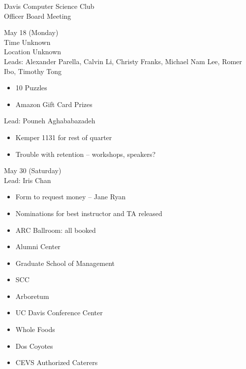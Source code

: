 \documentclass{article}
\begin{document}
\begin{Minutes}{Davis Computer Science Club\\Officer Board Meeting}

May 18 (Monday)\\
Time Unknown\\
Location Unknown\\
Leads: Alexander Parella, Calvin Li, Christy Franks, Michael Nam Lee, Romer Ibo, Timothy Tong\\

\begin{itemize}
	\item 10 Puzzles
	\item Amazon Gift Card Prizes
\end{itemize}


Lead: Pouneh Aghababazadeh

\begin{itemize}
	\item Kemper 1131 for rest of quarter
	\item Trouble with retention -- workshops, speakers?
\end{itemize}


May 30 (Saturday)\\
Lead: Iris Chan\\

\begin{itemize}
	\item Form to request money -- Jane Ryan
\item Nominations for best instructor and TA released
\end{itemize}


\begin{itemize}
	\item ARC Ballroom: all booked
	\item Alumni Center
	\item Graduate School of Management
	\item SCC
	\item Arboretum
	\item UC Davis Conference Center
\end{itemize}


\begin{itemize}
	\item Whole Foods
	\item Dos Coyotes
	\item CEVS Authorized Caterers
\end{itemize}


\end{Minutes}
\end{document}
